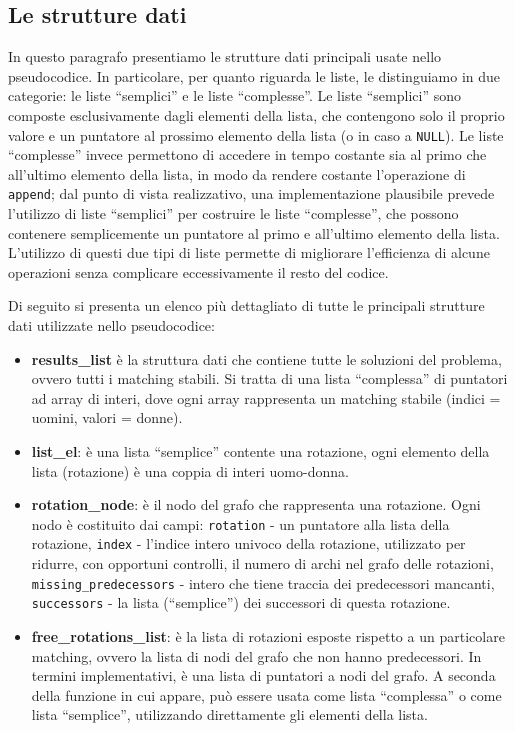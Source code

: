 \documentclass[12pt]{article}
\newcommand{\virg}[1]{``#1''}
\begin{document}
    \subsection{Le strutture dati}
    In questo paragrafo presentiamo le strutture dati principali usate nello pseudocodice. In particolare, per quanto riguarda le liste, le distinguiamo in due categorie: le liste \virg{semplici} e le liste \virg{complesse}. Le liste \virg{semplici} sono composte esclusivamente dagli elementi della lista, che contengono solo il proprio valore e un puntatore al prossimo elemento della lista (o in caso a \texttt{NULL}). Le liste \virg{complesse} invece permettono di accedere in tempo costante sia al primo che all'ultimo elemento della lista, in modo da rendere costante l'operazione di \texttt{append}; dal punto di vista realizzativo, una implementazione plausibile prevede l'utilizzo di liste \virg{semplici} per costruire le liste \virg{complesse}, che possono contenere semplicemente un puntatore al primo e all'ultimo elemento della lista. L'utilizzo di questi due tipi di liste permette di migliorare l'efficienza di alcune operazioni senza complicare eccessivamente il resto del codice.
    
    Di seguito si presenta un elenco più dettagliato di tutte le principali strutture dati utilizzate nello pseudocodice:

    \begin{itemize}
        \item \textbf{results\_list} è la struttura dati che contiene tutte le soluzioni del problema, ovvero tutti i matching stabili. Si tratta di una lista \virg{complessa} di puntatori ad array di interi, dove ogni array rappresenta un matching stabile (indici = uomini, valori = donne).
        \item \textbf{list\_el}: è una lista \virg{semplice} contente una rotazione, ogni elemento della lista (rotazione) è una coppia di interi uomo-donna.
        \item \textbf{rotation\_node}: è il nodo del grafo che rappresenta una rotazione. Ogni nodo è costituito dai campi: \texttt{rotation} - un puntatore alla lista della rotazione, \texttt{index} - l'indice intero univoco della rotazione, utilizzato per ridurre, con opportuni controlli, il numero di archi nel grafo delle rotazioni, \texttt{missing\_predecessors} - intero che tiene traccia dei predecessori mancanti, \texttt{successors} - la lista (\virg{semplice}) dei successori di questa rotazione.
        \item \textbf{free\_rotations\_list}: è la lista di rotazioni esposte rispetto a un particolare matching, ovvero la lista di nodi del grafo che non hanno predecessori. In termini implementativi, è una lista di puntatori a nodi del grafo. A seconda della funzione in cui appare, può essere usata come lista \virg{complessa} o come lista \virg{semplice}, utilizzando direttamente gli elementi della lista.
        
    \end{itemize}
        
\end{document}
